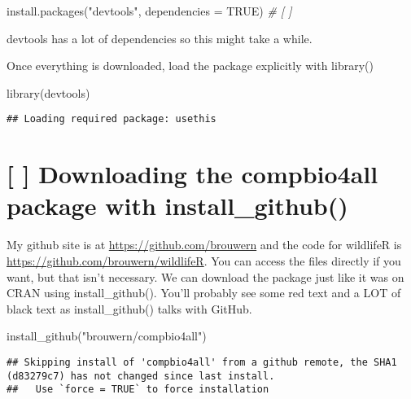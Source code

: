 \documentclass[
]{book}
\newenvironment{Shaded}{\begin{snugshade}}{\end{snugshade}}
\newcommand{\AttributeTok}[1]{\textcolor[rgb]{0.77,0.63,0.00}{#1}}
\newcommand{\CommentTok}[1]{\textcolor[rgb]{0.56,0.35,0.01}{\textit{#1}}}
\newcommand{\ConstantTok}[1]{\textcolor[rgb]{0.00,0.00,0.00}{#1}}
\newcommand{\FunctionTok}[1]{\textcolor[rgb]{0.00,0.00,0.00}{#1}}
\newcommand{\NormalTok}[1]{#1}
\newcommand{\StringTok}[1]{\textcolor[rgb]{0.31,0.60,0.02}{#1}}
\begin{document}
\begin{Shaded}
\begin{Highlighting}[]
\FunctionTok{install.packages}\NormalTok{(}\StringTok{"devtools"}\NormalTok{, }\AttributeTok{dependencies =} \ConstantTok{TRUE}\NormalTok{) }\CommentTok{\# [ ]}
\end{Highlighting}
\end{Shaded}

devtools has a lot of dependencies so this might take a while.

Once everything is downloaded, load the package explicitly with library()

\begin{Shaded}
\begin{Highlighting}[]
\FunctionTok{library}\NormalTok{(devtools)}
\end{Highlighting}
\end{Shaded}

\begin{verbatim}
## Loading required package: usethis
\end{verbatim}

\hypertarget{downloading-the-compbio4all-package-with-install_github}{%
\section{{[} {]} Downloading the compbio4all package with install\_github()}\label{downloading-the-compbio4all-package-with-install_github}}

My github site is at \url{https://github.com/brouwern} and the code for wildlifeR is \url{https://github.com/brouwern/wildlifeR}. You can access the files directly if you want, but that isn't necessary. We can download the package just like it was on CRAN using install\_github(). You'll probably see some red text and a LOT of black text as install\_github() talks with GitHub.

\begin{Shaded}
\begin{Highlighting}[]
\FunctionTok{install\_github}\NormalTok{(}\StringTok{"brouwern/compbio4all"}\NormalTok{)}
\end{Highlighting}
\end{Shaded}

\begin{verbatim}
## Skipping install of 'compbio4all' from a github remote, the SHA1 (d83279c7) has not changed since last install.
##   Use `force = TRUE` to force installation
\end{verbatim}
\end{document}
